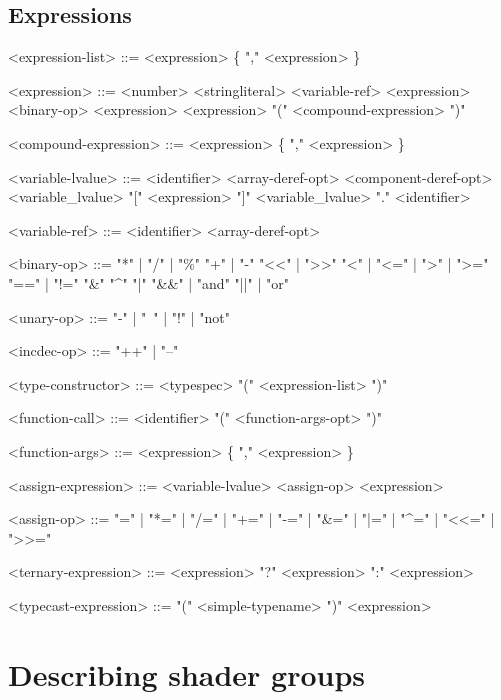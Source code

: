 \documentclass[11pt,letterpaper]{book}
\begin{document}
\section*{Expressions}
\begin{grammar}

<expression-list> ::= <expression> \{ "," <expression> \}

<expression> ::= <number>
\alt <stringliteral>
 <variable-ref>
\alt <expression> <binary-op> <expression>
 <expression>
\alt "(" <compound-expression> ")"

<compound-expression> ::= <expression> \{ "," <expression> \}

<variable-lvalue> ::= <identifier> <array-deref-opt> <component-deref-opt>
\alt <variable_lvalue> "[" <expression> "]"
\alt <variable_lvalue> "." <identifier>

<variable-ref> ::= <identifier> <array-deref-opt> 

<binary-op> ::= "*" | "/" | "\%"
\alt "+" | "-" 
\alt "<<" | ">>"
\alt "<" | "<=" | ">" | ">=" 
\alt "==" | "!=" 
\alt "&"
\alt "^"
\alt "|"
\alt "&&" | "and"
\alt "||" | "or"

<unary-op> ::= "-" | "~" | "!" | "not"

<incdec-op> ::= "++" | "--"

<type-constructor> ::= <typespec> "(" <expression-list> ")"

<function-call> ::= <identifier> "(" <function-args-opt> ")"

<function-args> ::= <expression> \{ "," <expression> \}

<assign-expression> ::= <variable-lvalue> <assign-op> <expression>

<assign-op> ::= "=" | "*=" | "/=" | "+=" | "-=" | "&=" | "|=" | "^=" |
"<<=" | ">>="

<ternary-expression> ::= <expression> "?" <expression> ":" <expression>

<typecast-expression> ::= "(" <simple-typename> ")" <expression>

\end{grammar}


\chapter{Describing shader groups}
\label{chap:describingshadergroups}
\label{sec:serialize}
\end{document}
